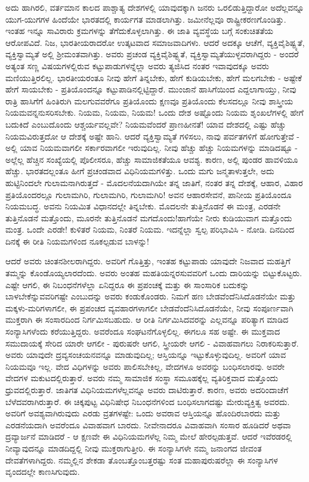 ಅದು ಹಾಗಿರಲಿ, ವರ್ತಮಾನ ಕಾಲದ ಪಾಶ್ಚಾತ್ಯ ದೇಶಗಳಲ್ಲಿ ಯಾವುದಕ್ಕಾಗಿ ಜನರು ಒರಲಿಡುತ್ತಿದ್ದಾರೋ ಅದೆಲ್ಲವನ್ನೂ ಯುಗ-ಯುಗಗಳ ಹಿಂದೆಯೇ ಭಾರತದಲ್ಲಿ ಕಾರ್ಯಗತ ಮಾಡಲಾಗಿತ್ತು. ಜಮೀನೆಲ್ಲವೂ ರಾಷ್ಟ್ರೀಕರಣಗೊಂಡಿತ್ತು. ಇಂತಹ ಇನ್ನೂ ಸಾವಿರಾರು ಕ್ರಮಗಳನ್ನು ತೆಗೆದುಕೊಳ್ಳಲಾಗಿತ್ತು. ಈ ಜಾತಿ ವ್ಯವಸ್ಥೆಯ ಬಗ್ಗೆ ಸಂಕುಚಿತತೆಯ ಆರೋಪವಿದೆ. ನಿಜ, ಭಾರತೀಯರಾದರೋ ಉತ್ಕಟವಾದ ಸಮಾಜವಾದಿಗಳು. ಆದರೆ ಅದಕ್ಕೂ ಆಚೆಗೆ, ವ್ಯಕ್ತಿವೈಶಿಷ್ಟ್ಯತೆ, ವ್ಯಕ್ತಿಸ್ವಾಮ್ಯತೆ ಅಲ್ಲಿ ಶ‍್ರೀಮಂತವಾಗಿತ್ತು. ಅವರು ಪ್ರಚಂಡ ವ್ಯಕ್ತಿವೈಶಿಷ್ಟ್ಯತೆ, ವ್ಯಕ್ತಿಸ್ವಾಮ್ಯತೆಯುಳ್ಳವರಾಗಿದ್ದರು - ಅಂದರೆ ಅತ್ಯಂತ ಸಣ್ಣ ವಿಷಯಗಳಲ್ಲಿರುವ ಕಟ್ಟುಪಾಡುಗಳನ್ನೆಲ್ಲಾ ಅವರು ತ್ಯಜಿಸಿದ ನಂತರ ಇವಾವುದಕ್ಕೂ ಅವರು ಮಣಿಯುತ್ತಿರಲಿಲ್ಲ. ಭಾರತೀಯರಂತೂ ನೀವು ಹೇಗೆ ತಿನ್ನಬೇಕು, ಹೇಗೆ ಕುಡಿಯಬೇಕು, ಹೇಗೆ ಮಲಗಬೇಕು - ಅಷ್ಟೇಕೆ ಹೇಗೆ ಸಾಯಬೇಕು - ಪ್ರತಿಯೊಂದನ್ನೂ ಕಟ್ಟುಪಾಡಿನಲ್ಲಿಟ್ಟಿದ್ದಾರೆ. ಮುಂಜಾನೆ ಹಾಸಿಗೆಯಿಂದ ಎದ್ದಲಾಗಾಯ್ತು, ನೀವು ರಾತ್ರಿ ಹಾಸಿಗೆಗೆ ಹಿಂತಿರುಗಿ ಮಲಗುವವರೆಗೂ ಪ್ರತಿಯೊಂದು ಕ್ಷಣವೂ ಪ್ರತಿಯೊಂದು ಕೆಲಸದಲ್ಲೂ ನೀವು ಶಾಸ್ತ್ರೀಯ ನಿಯಮವನ್ನನುಸರಿಸಬೇಕು. ನಿಯಮ, ನಿಯಮ, ನಿಯಮ! ಒಂದು ದೇಶ ಅಷ್ಟೊಂದು ನಿಯಮ ಶೃಂಖಲೆಗಳಲ್ಲಿ ಹೇಗೆ ಬದುಕಿದೆ ಎಂಬುದೊಂದು ಆಶ್ಚರ್ಯವಲ್ಲವೇ? ನಿಯಮವೆಂದರೆ ಪ್ರಾಣಹೀನತೆ! ಯಾವ ದೇಶದಲ್ಲಿ ಎಷ್ಟು ಹೆಚ್ಚು ನಿಯಮವಿರುತ್ತದೋ ಆ ದೇಶಕ್ಕೆ ಅಷ್ಟೇ ಹಾನಿ. ಆದರೆ ವ್ಯಕ್ತಿಸ್ವಾಮ್ಯತೆ ಗಳಿಸಲು, ನಾವು ಪರ್ವತಗಳಿಗೆ ಹೋಗುತ್ತೇವೆ - ಅಲ್ಲಿ ಯಾವ ನಿಯಮವಾಗಲೀ ಸರ್ಕಾರವಾಗಲೀ ಇರುವುದಿಲ್ಲ. ನೀವು ಹೆಚ್ಚು ಹೆಚ್ಚು ನಿಯಮಗಳನ್ನು ಮಾಡಿದಷ್ಟೂ - ಅಲ್ಲೆಲ್ಲ ಹೆಚ್ಚಿನ ಸಂಖ್ಯೆಯಲ್ಲಿ ಪೊಲೀಸರೂ, ಹೆಚ್ಚು ಸಾಮಾಜಿಕತೆಯೂ ಆವಶ್ಯ. ಕಾರಣ, ಅಲ್ಲಿ ಪುಂಡರ ಹಾವಳಿಯೂ ಹೆಚ್ಚು. ಭಾರತದಲ್ಲಂತೂ ಹೀಗೆ ಪ್ರಚಂಡವಾದ ವಿಧಿನಿಯಮಗಳಿತ್ತು. ಒಂದು ಮಗು ಜನ್ಮತಾಳುತ್ತಲೇ, ಅದು ಹುಟ್ಟಿನಿಂದಲೇ ಗುಲಾಮನಾಗಿರುತ್ತದೆ - ಮೊದಲನೆಯದಾಗಿಯೇ ತನ್ನ ಜಾತಿಗೆ, ನಂತರ ತನ್ನ ದೇಶಕ್ಕೆ, ಆಹಾರ, ವಿಹಾರ ಪ್ರತಿಯೊಂದರಲ್ಲೂ ಗುಲಾಮಗಿರಿ, ಗುಲಾಮಗಿರಿ, ಗುಲಾಮಗಿರಿ! ಅವನ ಆಹಾರಸೇವನೆ, ಪಾನೀಯ ಪ್ರತಿಯೊಂದೂ ನಿಯಮಬದ್ಧ. ಅವನು ನಿಯಮಿತ ವಿಧಾನದಲ್ಲೇ ತಿನ್ನಬೇಕು. ಮೊದಲನೇ ತುತ್ತಿನೊಡನೆ ಈ ಮಂತ್ರ, ಎರಡನೇ ತುತ್ತಿನೊಡನೆ ಮತ್ತೊಂದು, ಮೂರನೇ ತುತ್ತಿನೊಡನೆ ಮಗದೊಂದು!ಹಾಗೆಯೇ ನೀರು ಕುಡಿಯುವಾಗ ಮತ್ತೊಂದು ಮಂತ್ರ. ಒಂದೇ ಎರಡೇ! ಕುಳಿತರೆ ನಿಯಮ, ನಿಂತರೆ ನಿಯಮ. ಇದನ್ನೆಲ್ಲಾ ಸ್ವಲ್ಪ ಪರಿಭಾವಿಸಿ - ನೋಡಿ. ದಿನದಿಂದ ದಿನಕ್ಕೆ ಈ ರೀತಿ ನಿಯಮಗಳಿಂದ ನೂಕಲ್ಪಡುವ ಬಾಳನ್ನು!

ಆದರೆ ಅವರು ಚಿಂತನಶೀಲರಾಗಿದ್ದರು. ಅವರಿಗೆ ಗೊತ್ತಿತ್ತು, ಇಂತಹ ಕಟ್ಟುಪಾಡು ಯಾವುದೇ ನಿಜವಾದ ಮಹತ್ತಿಗೆ ತಮ್ಮನ್ನು ಕೊಂಡೊಯ್ಯಲಾರದೆಂದು. ಅವರು ಅಂತಹ ಮಹತಿಯನ್ನರಸುವವರಿಗೆ ಒಂದು ದಾರಿಯನ್ನು ಬಿಟ್ಟುಕೊಟ್ಟರು. ಎಷ್ಟೇ ಆಗಲಿ, ಈ ನಿಬಂಧನೆಗಳೆಲ್ಲಾ ಏನಿದ್ದರೂ ಈ ಪ್ರಪಂಚಕ್ಕೆ ಮತ್ತು ಈ ಸಾಂಸಾರಿಕ ಬದುಕನ್ನು ಬಾಳಬೇಕೆನ್ನುವವರಿಗಷ್ಟೇ ಎಂಬುದನ್ನು ಅವರು ಕಂಡುಕೊಂಡರು. ನಿಮಗೆ ಹಣ ಬೇಡವೆಂದೆನಿಸಿದೊಡನೆಯೇ ಮತ್ತು ಮಕ್ಕಳು-ಮರಿಗಳಾಗಲೀ, ಈ ಪ್ರಪಂಚದ ವ್ಯವಹಾರಗಳಾಗಲೀ ಬೇಡವೆಂದೆನಿಸಿದೊಡನೆಯೇ, ನೀವು ಸಂಪೂರ್ಣವಾಗಿ ಮುಕ್ತರಾಗಿ ಈ ಸಂಸಾರದಿಂದ ನಿರ್ಗಮಿಸಬಹುದು. ಆ ರೀತಿ ನಿರ್ಗಮಿಸಿದವರನ್ನು ಎಲ್ಲವನ್ನೂ ಪರಿತ್ಯಾಗ ಮಾಡಿದ ಸಂನ್ಯಾಸಿಗಳೆಂದು ಕರೆಯುತ್ತಿದ್ದರು. ಅವರೆಂದೂ ಸಂಘಟನೆಗೊಳ್ಳಲಿಲ್ಲ. ಈಗಲೂ ಸಹ ಅಷ್ಟೇ. ಈ ಮುಕ್ತವಾದ ಸಮುದಾಯಕ್ಕೆ ಸೇರಿದ ಯಾರೇ ಆಗಲೀ - ಪುರುಷರೇ ಆಗಲಿ, ಸ್ತ್ರೀಯರೇ ಆಗಲಿ - ವಿವಾಹವಾಗಲು ನಿರಾಕರಿಸುತ್ತಾರೆ. ಅವರು ಯಾವುದೇ ದ್ರವ್ಯಸಂಚಯನವನ್ನೂ ಮಾಡುವುದಿಲ್ಲ; ಆಸ್ತಿಯನ್ನೂ ಇಟ್ಟುಕೊಳ್ಳುವುದಿಲ್ಲ. ಅವರಿಗೆ ಯಾವ ನಿಯಮವೂ ಇಲ್ಲ. ವೇದ ವಿಧಿಗಳನ್ನು ಅವರು ಪಾಲಿಸಬೇಕಿಲ್ಲ, ವೇದಗಳೂ ಅವರನ್ನು ಬಂಧಿಸಲಾರವು. ಅವರೇ ವೇದಗಳ ಮಕುಟದಲ್ಲಿರುತ್ತಾರೆ. ಅವರು ನಮ್ಮ ಸಾಮಾಜಿಕ ಸಂಸ್ಥಾ ಸಮೂಹಕ್ಕೆಲ್ಲ ವ್ಯತಿರಿಕ್ತವಾದ ಮತ್ತೊಂದು ಧ್ರುವದಲ್ಲಿರುತ್ತಾರೆ. ಜಾತಿಗತ ವಿಧಿನಿಯಮಗಳೆಲ್ಲವನ್ನೂ ಅವರು ದಾಟಿರುತ್ತಾರೆ. ಕಾರಣ, ಅವರು ಅದರಿಂದಾಚೆಗೆ ಬೆಳೆದವರಾಗಿರುತ್ತಾರೆ. ಈ ಚಿಕ್ಕಪುಟ್ಟ ವಿಧಿನಿಷೇಧ ನಿಬಂಧನೆಗಳಿಂದ ಬಂಧಿಸಲಾಗದಷ್ಟು ಮೇರುವ್ಯಕ್ತಿತ್ವ ಅವರದು. ಅವರಿಗೆ ಅವಶ್ಯವಾಗಿರುವುದು ಎರಡು ವ್ರತಗಳಷ್ಟೇ: ಒಂದು ಅವರಾವ ಆಸ್ತಿಯನ್ನೂ ಹೊಂದಿರಬಾರದು ಮತ್ತು ಎರಡನೆಯದಾಗಿ ಅವರೆಂದೂ ವಿವಾಹವಾಗ ಬಾರದು. ನೀವೇನಾದರೂ ವಿವಾಹವಾಗಿ ಸಂಸಾರ ಹೂಡಿದರೆ ಅಥವಾ ದ್ರವ್ಯಾರ್ಜನೆ ಮಾಡಿದರೆ - ಆ ಕ್ಷಣವೇ ಈ ವಿಧಿನಿಯಮಗಳೆಲ್ಲ ನಿಮ್ಮ ಮೇಲೆ ಹೇರಲ್ಪಡುತ್ತವೆ. ಆದರೆ ಇವೆರಡರಲ್ಲಿ ನೀವ್ಯಾವುದನ್ನೂ ಮಾಡದಿದ್ದಲ್ಲಿ ನೀವು ಮುಕ್ತರಾಗುತ್ತೀರಿ. ಈ ಸಂನ್ಯಾಸಿಗಳೇ ನಮ್ಮ ಜನಾಂಗದ ಜೀವಂತ ದೇವತೆಗಳಾಗಿದ್ದರು. ನಮ್ಮಲ್ಲಿನ ಶೇಕಡಾ ತೊಂಬತ್ತೊಂಬತ್ತರಷ್ಟು ಸಂತ ಮಹಾಪುರುಷರೆಲ್ಲಾ ಈ ಸಂನ್ಯಾಸಿಗಳ ವೃಂದದಲ್ಲೇ ಕಾಣಸಿಗುವುದು.

